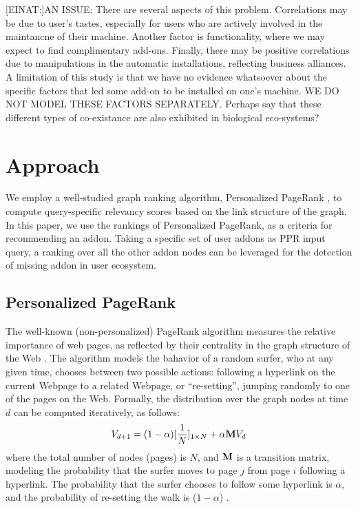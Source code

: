 \documentclass[11pt,oneside]{book}
\let\Oldsection\section
\renewcommand{\section}{\FloatBarrier\Oldsection}
\let\Oldsubsection\subsection
\renewcommand{\subsection}{\FloatBarrier\Oldsubsection}
\newcommand{\transition}{{\bf M}}
\begin{document}
[EINAT:]AN ISSUE: There are several aspects of this problem. Correlations may
be due to user's tastes, especially for users who are actively
involved in the maintancne of their machine. Another factor is
functionality, where we may expect to find complimentary
add-ons. Finally, there may be positive correlations due to
manipulations in the automatic installations, reflecting business
alliances. A limitation of this study is that we have no evidence
whatsoever about the specific factors that led some add-on to be
installed on one's machine. WE DO NOT MODEL THESE FACTORS
SEPARATELY. Perhaps say that these different types of co-existance are
also exhibited in biological eco-systems?

\section{Approach}
\label{sec:method}

We employ a well-studied graph ranking algorithm, Personalized
PageRank \citep{page1999pagerank}, to compute query-specific relevancy
scores based on the link structure of the graph. In this paper, we use
the rankings of Personalized PageRank, as a criteria for recommending
an addon. Taking a specific set of user addons as PPR input query, a
ranking over all the other addon nodes can be leveraged for the
detection of missing addon in user ecosystem.

\subsection{Personalized PageRank}
\label{sec:PPR_addons_method}

The well-known (non-personalized) PageRank algorithm measures the
relative importance of web pages, as reflected by their centrality in
the graph structure of the Web \citep{page1999pagerank}. The algorithm
models the bahavior of a random surfer, who at any given time, chooses
between two possible actions: following a hyperlink on the current
Webpage to a related Webpage, or ``re-setting'', jumping randomly to
one of the pages on the Web. Formally, the distribution over the graph
nodes at time $d$ can be computed iteratively, as follows:
\begin{equation}
V_{d+1} = (1-\alpha) [{1 \over N}]_{1 \times N} + \alpha \transition V_d
\label{eq:pagerank}
\end{equation}
where the total number of nodes (pages) is $N$, and $\transition$
is a transition matrix, modeling the probability that the surfer moves
to page $j$ from page $i$ following a hyperlink. The probability that
the surfer chooses to follow some hyperlink is $\alpha$, and the
probability of re-setting the walk is ($1-\alpha$) .
\end{document}
